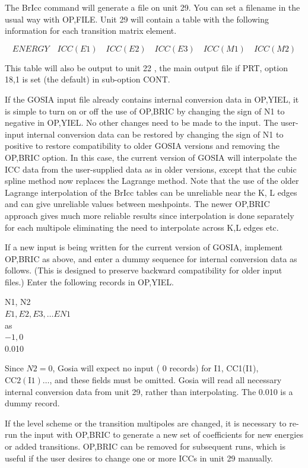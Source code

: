 \documentclass[10pt]{article}
\begin{document}
The BrIcc command will generate a file on unit 29. You can set a filename in the usual way with OP,FILE. Unit 29 will contain a table with the following information for each transition matrix element.

$$
E N E R G Y \quad I C C(E 1) \quad I C C(E 2) \quad I C C(E 3) \quad I C C(M 1) \quad I C C(M 2)
$$

This table will also be output to unit 22 , the main output file if PRT, option 18,1 is set (the default) in sub-option CONT.

If the GOSIA input file already contains internal conversion data in OP,YIEL, it is simple to turn on or off the use of OP,BRIC by changing the sign of N1 to negative in OP,YIEL. No other changes need to be made to the input. The user-input internal conversion data can be restored by changing the sign of N1 to positive to restore compatibility to older GOSIA versions and removing the OP,BRIC option. In this case, the current version of GOSIA will interpolate the ICC data from the user-supplied data as in older versions, except that the cubic spline method now replaces the Lagrange method. Note that the use of the older Lagrange interpolation of the BrIcc tables can be unreliable near the K, L edges and can give unreliable values between meshpoints. The newer OP,BRIC approach gives much more reliable results since interpolation is done separately for each multipole eliminating the need to interpolate across K,L edges etc.

If a new input is being written for the current version of GOSIA, implement OP,BRIC as above, and enter a dummy sequence for internal conversion data as follows. (This is designed to preserve backward compatibility for older input files.) Enter the following records in OP,YIEL.

N1, N2\\
$E 1, E 2, E 3, \ldots E N 1$\\
as\\
$-1,0$\\
0.010

Since $N 2=0$, Gosia will expect no input ( 0 records) for I1, CC1(I1), $\mathrm{CC} 2(\mathrm{I} 1) \ldots$, and these fields must be omitted. Gosia will read all necessary internal conversion data from unit 29, rather than interpolating. The 0.010 is a dummy record.

If the level scheme or the transition multipoles are changed, it is necessary to re-run the input with OP,BRIC to generate a new set of coefficients for new energies or added transitions. OP,BRIC can be removed for subsequent runs, which is useful if the user desires to change one or more ICCs in unit 29 manually.
\end{document}
